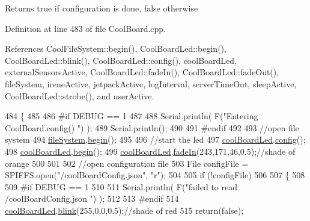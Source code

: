 \begin{DoxyReturn}{Returns}
true if configuration is done, false otherwise 
\end{DoxyReturn}


Definition at line 483 of file Cool\+Board.\+cpp.



References Cool\+File\+System\+::begin(), Cool\+Board\+Led\+::begin(), Cool\+Board\+Led\+::blink(), Cool\+Board\+Led\+::config(), cool\+Board\+Led, external\+Sensors\+Active, Cool\+Board\+Led\+::fade\+In(), Cool\+Board\+Led\+::fade\+Out(), file\+System, irene\+Active, jetpack\+Active, log\+Interval, server\+Time\+Out, sleep\+Active, Cool\+Board\+Led\+::strobe(), and user\+Active.


\begin{DoxyCode}
484 \{
485 
486 \textcolor{preprocessor}{#if DEBUG == 1}
487 
488     Serial.println( F(\textcolor{stringliteral}{"Entering CoolBoard.config() "}) );
489     Serial.println();
490 
491 \textcolor{preprocessor}{#endif}
492 
493     \textcolor{comment}{//open file system}
494     \hyperlink{classCoolBoard_a42c2586fbb13ff7f06538e9284e8538d}{fileSystem}.\hyperlink{classCoolFileSystem_a6ba6f666ed4c530174f8569d2c636748}{begin}();
495     
496     \textcolor{comment}{//start the led}
497     \hyperlink{classCoolBoard_a1b1d3c684a5baa56b08486e192fd8e97}{coolBoardLed}.\hyperlink{classCoolBoardLed_a1b60e5e30bea96c49ed62ed1bf1ffc8b}{config}();
498     \hyperlink{classCoolBoard_a1b1d3c684a5baa56b08486e192fd8e97}{coolBoardLed}.\hyperlink{classCoolBoardLed_ae3cbde8affcc6f011cbd698c8ef911f6}{begin}();
499     \hyperlink{classCoolBoard_a1b1d3c684a5baa56b08486e192fd8e97}{coolBoardLed}.\hyperlink{classCoolBoardLed_ab778f5e7bed0ab74e3906d82110493c3}{fadeIn}(243,171,46,0.5);\textcolor{comment}{//shade of orange     }
500 
501     
502     \textcolor{comment}{//open configuration file}
503     File configFile = SPIFFS.open(\textcolor{stringliteral}{"/coolBoardConfig.json"}, \textcolor{stringliteral}{"r"});
504     
505     \textcolor{keywordflow}{if} (!configFile)
506 
507     \{
508     
509 \textcolor{preprocessor}{    #if DEBUG == 1}
510 
511         Serial.println( F(\textcolor{stringliteral}{"failed to read /coolBoardConfig.json  "}) );
512 
513 \textcolor{preprocessor}{    #endif}
514         \hyperlink{classCoolBoard_a1b1d3c684a5baa56b08486e192fd8e97}{coolBoardLed}.\hyperlink{classCoolBoardLed_a96e1ea13003eee34c9dbcef340404426}{blink}(255,0,0,0.5);\textcolor{comment}{//shade of red     }
515         \textcolor{keywordflow}{return}(\textcolor{keyword}{false});

\end{DoxyCode}
